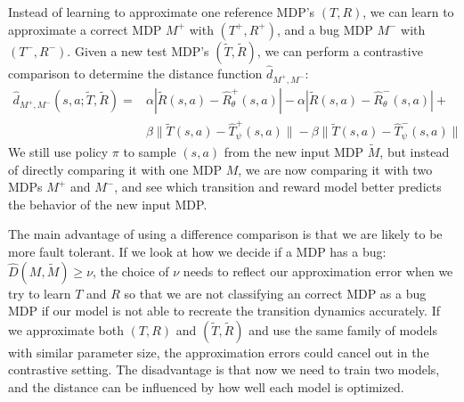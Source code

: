 \documentclass{article}
\begin{document}
Instead of learning to approximate one reference MDP's $(T, R)$, we can learn to approximate a correct MDP $M^+$ with $(T^+, R^+)$, and a bug MDP $M^-$ with $(T^-, R^-)$. Given a new test MDP's $(\tilde T, \tilde R)$, we can perform a contrastive comparison to determine the distance function $\hat d_{M^+, M^-}$:
\begin{align}
\hat d_{M^+, M^-}(s, a; \tilde T, \tilde R) = &\alpha |\tilde R(s, a) - \hat R^{+}_{\theta}(s, a)| - \alpha |\tilde R(s, a) - \hat R^{-}_{\theta}(s, a)| + \\
& \beta \| \tilde T(s, a) - \hat T^{+}_{\psi}(s, a) \| - \beta \| \tilde T(s, a) - \hat T^{-}_{\psi}(s, a) \|
\end{align}
We still use policy $\pi$ to sample $(s, a)$ from the new input MDP $\tilde M$,
but instead of directly comparing it with one MDP $M$, we are now comparing it with two MDPs $M^+$ and $M^-$, and see which transition and reward model better predicts the behavior of the new input MDP.

The main advantage of using a difference comparison is that we are likely to be more fault tolerant. If we look at how we decide if a MDP has a bug: $\hat D(M, \tilde M) \geq \nu$, the choice of $\nu$ needs to reflect our approximation error when we try to learn $T$ and $R$ so that we are not classifying an correct MDP as a bug MDP if our model is not able to recreate the transition dynamics accurately. If we approximate both $(T, R)$ and $(\tilde T, \tilde R)$ and use the same family of models with similar parameter size, the approximation errors could cancel out in the contrastive setting. The disadvantage is that now we need to train two models, and the distance can be influenced by how well each model is optimized.
\end{document}
